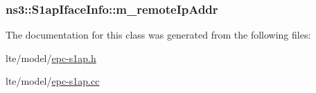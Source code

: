 \subsubsection[{\texorpdfstring{m\+\_\+remote\+Ip\+Addr}{m_remoteIpAddr}}]{ ns3\+::\+S1ap\+Iface\+Info\+::m\+\_\+remote\+Ip\+Addr}\hypertarget{classns3_1_1S1apIfaceInfo_aed36ecb56275b66a24fad05806a31b95}{}\label{classns3_1_1S1apIfaceInfo_aed36ecb56275b66a24fad05806a31b95}


The documentation for this class was generated from the following files\+:\begin{DoxyCompactItemize}
\item 
lte/model/\hyperlink{epc-s1ap_8h}{epc-\/s1ap.\+h}\item 
lte/model/\hyperlink{epc-s1ap_8cc}{epc-\/s1ap.\+cc}\end{DoxyCompactItemize}
